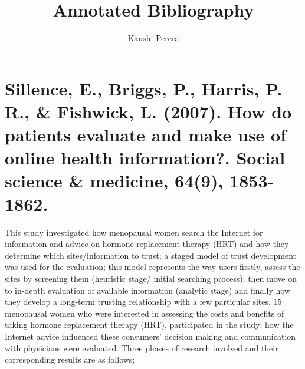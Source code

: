 \documentclass[]{article}
\title{Annotated Bibliography}
\author{Kaushi Perera}
\begin{document}
	
\maketitle
	
\section{Sillence, E., Briggs, P., Harris, P. R., \& Fishwick, L. (2007). How do patients evaluate and make use of online health information?. Social science \& medicine, 64(9), 1853-1862.} 

This study investigated how menopausal women search the Internet for information and advice on hormone replacement therapy (HRT) and how they determine which sites/information to trust; a staged model of trust development was used for the evaluation; this model represents the way users firstly, assess the sites by screening them (heuristic stage/ initial searching process), then move on to in-depth evaluation of available information (analytic stage) and finally how they develop a long-term trusting relationship with a few particular sites. 15 menopausal women who were interested in assessing the costs and benefits of taking hormone replacement therapy (HRT), participated in the study; how the Internet advice influenced these consumers' decision making and communication with physicians were evaluated. Three phases of research involved and their corresponding results are as follows;  
\end{document}

